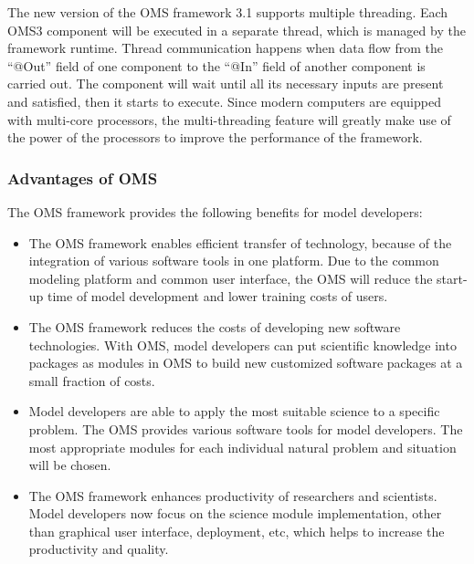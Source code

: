 The new version of the OMS framework 3.1 supports multiple threading. Each OMS3 component will be executed in a separate thread, which is managed by the framework runtime. Thread communication happens when data flow from the “@Out” field of one component to the “@In” field of another component is carried out. The component will wait until all its necessary inputs are present and satisfied, then it starts to execute. Since modern computers are equipped with multi-core processors, the multi-threading feature will greatly make use of the power of the processors to improve the performance of the framework.
\par
\subsubsection{Advantages of OMS}
\par
The OMS framework provides the following benefits for model developers: \autocite{dsl:oms-ahuja}
\begin{itemize}
\item The OMS framework enables efficient transfer of technology, because of the  integration of various software tools in one platform. Due to the common modeling platform and common user interface, the OMS will reduce the start-up time of model development and lower training costs of users.

\item The OMS framework reduces the costs of developing new software technologies. With OMS, model developers can put scientific knowledge into packages as modules in OMS to build new customized software packages at a small fraction of costs.

\item Model developers are able to apply the most suitable science to a specific problem. The OMS provides various software tools for model developers. The most appropriate modules for each individual natural problem and situation will be chosen.

\item The OMS framework enhances productivity of researchers and scientists. Model developers now focus on the science module implementation, other than graphical user interface, deployment, etc, which helps to increase the productivity and quality.

\end{itemize}
